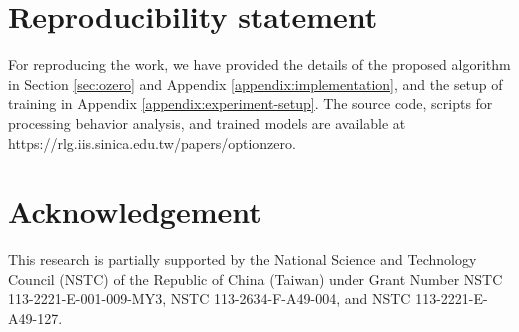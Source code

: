 \section*{Reproducibility statement}

For reproducing the work, we have provided the details of the proposed algorithm in Section \ref{sec:ozero} and Appendix \ref{appendix:implementation}, and the setup of training in Appendix \ref{appendix:experiment-setup}.
The source code, scripts for processing behavior analysis, and trained models are available at https://rlg.iis.sinica.edu.tw/papers/optionzero.

\section*{Acknowledgement}
This research is partially supported by the National Science and Technology Council (NSTC) of the Republic of China (Taiwan) under Grant Number NSTC 113-2221-E-001-009-MY3, NSTC 113-2634-F-A49-004, and NSTC 113-2221-E-A49-127.
